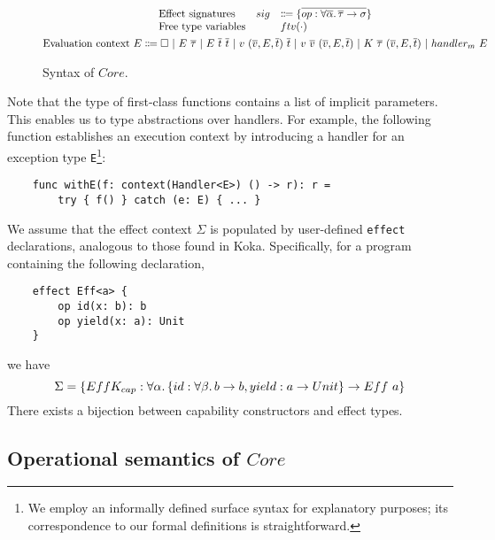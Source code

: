 \documentclass[acmsmall,review,screen]{acmart}
\newcommand{\vor}{~|~}
\newcommand{\ap}{~}
\begin{document}
\begin{figure}
\begin{gather*}
\begin{array}{lrl}
            \text{Effect signatures} & sig &\Coloneqq \{\overline{op : \forall\overline{\alpha}\ldotp\overline{\tau}\to\sigma}\} \\
            \text{Free type variables} & & ftv(\cdot) \\
        \end{array}\\
        \begin{aligned}
            \text{Evaluation context } E \Coloneqq \square \vor E \ap \overline{\tau} \vor E \ap \overline{t}\ap \overline{t} \vor v \ap (\overline{v}, E, \overline{t}) \ap \overline{t} \vor v \ap \overline{v} \ap (\overline{v}, E, \overline{t}) \vor K\ap\overline{\tau}\ap(\overline{v}, E, \overline{t}) \vor handler_m ~ E
        \end{aligned}\\
    \end{gather*}
    \caption{Syntax of $Core$.}
    \label{fig:core-syntax}
\end{figure}

Note that the type of first-class functions contains a list of implicit parameters.
This enables us to type abstractions over handlers.
For example, the following function establishes an execution context by introducing a handler for an exception type \texttt{E}\footnote{We employ an informally defined surface syntax for explanatory purposes; its correspondence to our formal definitions is straightforward.}:
\begin{verbatim}
    func withE(f: context(Handler<E>) () -> r): r =
        try { f() } catch (e: E) { ... }
\end{verbatim}

We assume that the effect context $\Sigma$ is populated by user-defined \texttt{effect} declarations, analogous to those found in Koka. %
Specifically, for a program containing the following declaration,
\begin{verbatim}
    effect Eff<a> {
        op id(x: b): b
        op yield(x: a): Unit
    }
\end{verbatim}
we have \[\Sigma = \{EffK_{cap} : \forall\alpha\ldotp\{id : \forall\beta\ldotp b\to b, yield : a \to Unit\} \to Eff\ap a\}\]
There exists a bijection between capability constructors and effect types.

\subsection{Operational semantics of $Core$}
\end{document}
